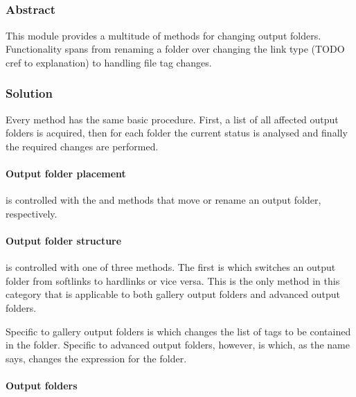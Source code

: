 \subsection{}
\def\kapitelautor{Clemens Stadlbauer}

\subsubsection{Abstract}

This module provides a multitude of methods for changing output folders.
Functionality spans from renaming a folder over changing the link type (TODO
cref to explanation) to handling file tag changes.

\subsubsection{Solution} %

Every method has the same basic procedure. First, a list of all affected output
folders is acquired, then for each folder the current status is analysed and
finally the required changes are performed.


\paragraph{Output folder placement}

is controlled with the  and  methods that move or
rename an output folder, respectively.

\paragraph{Output folder structure} %

is controlled with one of three methods. The first is 
which switches an output folder from softlinks to hardlinks or vice versa. This
is the only method in this category that is applicable to both gallery output
folders and advanced output folders.

Specific to gallery output folders is  which changes
the list of tags to be contained in the folder. Specific to advanced output
folders, however, is  which, as the name says,
changes the expression for the folder.

\paragraph{Output folders}

